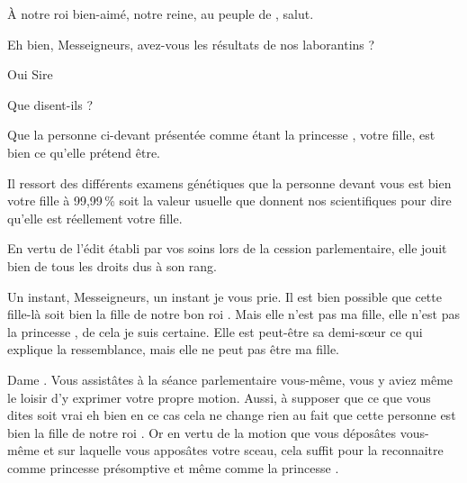 \scene

\StageDirII{\roi, \reine, \nobleOne, \nobleTwo, \nobleTree, \ela, \vladimir, \huissier, \greffier, \kingsgards}





\begin{drama}
  \nobleOnespeaks À notre roi bien-aimé, notre reine, au peuple de \campprincipal{}, salut.

  \roispeaks Eh bien, Messeigneurs, avez-vous les résultats de nos laborantins ?

  \nobleTwospeaks Oui Sire

  \roispeaks Que disent-ils ?

  \nobleTreespeaks Que la personne ci-devant présentée comme étant la princesse \princesse{}, votre fille, est bien ce qu’elle prétend être.


  \nobleOnespeaks Il ressort des différents examens génétiques que la personne devant vous est bien votre fille à 99,99\,\% soit la valeur usuelle que donnent nos scientifiques pour dire qu’elle est réellement votre fille.

  \nobleTwospeaks En vertu de l’édit établi par vos soins lors de la cession parlementaire, elle jouit bien de tous les droits dus à son rang.

  \reinespeaks {} Un instant, Messeigneurs, un instant je vous prie. Il est bien possible que cette fille-là soit bien la fille de notre bon roi \roi. Mais elle n’est pas ma fille, elle n’est pas la princesse \princesse{}, de cela je suis certaine. Elle est peut-être sa demi-sœur ce qui explique la ressemblance, mais elle ne peut pas être ma fille.

  \nobleTreespeaks Dame \reine. Vous assistâtes à la séance parlementaire vous-même, vous y aviez même le loisir d’y exprimer votre propre motion. Aussi, à supposer que ce que vous dites soit vrai  eh bien en ce cas cela ne change rien au fait que cette personne est bien la fille de notre roi \roi. Or en vertu de la motion que vous déposâtes vous-même et sur laquelle vous apposâtes votre sceau, cela suffit pour la reconnaitre comme princesse présomptive et même comme la princesse \princesse{}.


\end{drama}
